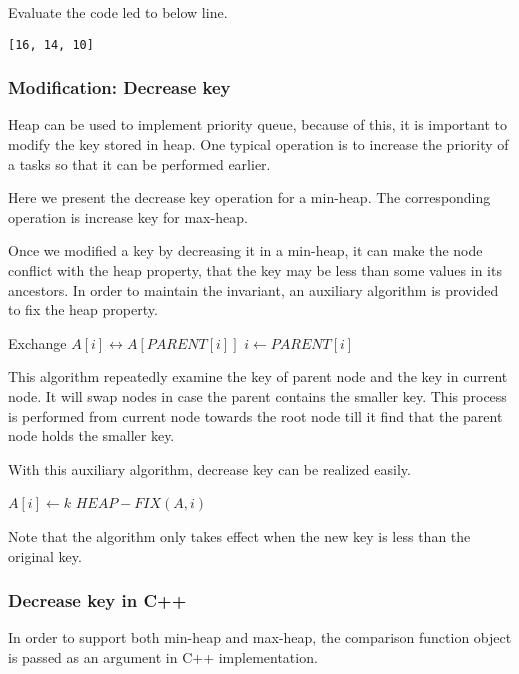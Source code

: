 \documentclass{article}
\begin{document}
Evaluate the code led to below line.

\begin{lstlisting}
[16, 14, 10]
\end{lstlisting}

\subsubsection{Modification: Decrease key}

Heap can be used to implement priority queue, because of this, it
is important to modify the key stored in heap. One typical operation
is to increase the priority of a tasks so that it can be performed
earlier.

Here we present the decrease key operation for a min-heap. The
corresponding operation is increase key for max-heap.

Once we modified a key by decreasing it in a min-heap, it can make
the node conflict with the heap property, that the key may be less
than some values in its ancestors. In order to maintain the
invariant, an auxiliary algorithm is provided to fix the heap
property.

\begin{algorithmic}[1]
    \State Exchange $A[i] \leftrightarrow A[PARENT[i]]$
    \State $i \gets PARENT[i]$
  \EndWhile
\EndFunction
\end{algorithmic}

This algorithm repeatedly examine the key of parent node and
the key in current node. It will swap nodes in case the
parent contains the smaller key. This process is performed
from current node towards the root node till it find that
the parent node holds the smaller key.

With this auxiliary algorithm, decrease key can be realized
easily.

\begin{algorithmic}[1]
    \State $A[i] \gets k$
    \State $HEAP-FIX(A, i)$
  \EndIf
\EndFunction
\end{algorithmic}

Note that the algorithm only takes effect when the new key
is less than the original key.

\subsubsection*{Decrease key in C++}
In order to support both min-heap and max-heap, the comparison
function object is passed as an argument in C++ implementation.
\end{document}
